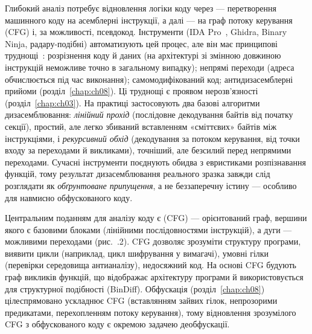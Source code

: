Глибокий аналіз потребує відновлення логіки коду через  --- перетворення машинного коду на асемблерні інструкції, а далі --- на граф потоку керування (CFG) і, за можливості, псевдокод. Інструменти (IDA Pro~\cite{ch05:eagle}, Ghidra, Binary Ninja, радару-подібні) автоматизують цей процес, але він має принципові труднощі~\cite{ch06:andriesse}: розрізнення коду й даних (на архітектурі зі змінною довжиною інструкцій неможливе точно в загальному випадку); непрямі переходи (адреса обчислюється під час виконання); самомодифікований код; антидизасемблерні прийоми (розділ~\ref{chap:ch08}). Ці труднощі є проявом нерозв'язності (розділ~\ref{chap:ch03}). На практиці застосовують два базові алгоритми дизасемблювання: \emph{лінійний прохід} (послідовне декодування байтів від початку секції), простий, але легко збиваний вставленням «сміттєвих» байтів між інструкціями, і \emph{рекурсивний обхід} (декодування за потоком керування, від точки входу за переходами й викликами), точніший, але безсилий перед непрямими переходами. Сучасні інструменти поєднують обидва з евристиками розпізнавання функцій, тому результат дизасемблювання реального зразка завжди слід розглядати як \emph{обґрунтоване припущення}, а не беззаперечну істину --- особливо для навмисно обфускованого коду.

Центральним поданням для аналізу коду є  (CFG) --- орієнтований граф, вершини якого є базовими блоками (лінійними послідовностями інструкцій), а дуги --- можливими переходами (рис.~\thechapter.2). CFG дозволяє зрозуміти структуру програми, виявити цикли (наприклад, цикл шифрування у вимагачі), умовні гілки (перевірки середовища антианалізу), недосяжний код. На основі CFG будують граф викликів функцій, що відображає архітектуру програми й використовується для структурної подібності (BinDiff). Обфускація (розділ~\ref{chap:ch08}) цілеспрямовано ускладнює CFG (вставлянням зайвих гілок, непрозорими предикатами, перехопленням потоку керування), тому відновлення зрозумілого CFG з обфускованого коду є окремою задачею деобфускації.

\begin{tikzfig}

\end{tikzfig}

